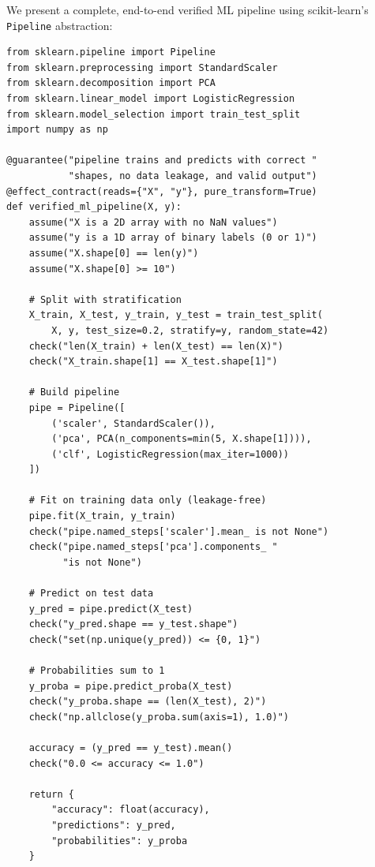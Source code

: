 \documentclass[11pt,a4paper]{report}
\theoremstyle{definition}
\theoremstyle{plain}
\begin{document}
We present a complete, end-to-end verified ML pipeline using
scikit-learn's \texttt{Pipeline} abstraction:

\begin{lstlisting}[style=synhopy]
from sklearn.pipeline import Pipeline
from sklearn.preprocessing import StandardScaler
from sklearn.decomposition import PCA
from sklearn.linear_model import LogisticRegression
from sklearn.model_selection import train_test_split
import numpy as np

@guarantee("pipeline trains and predicts with correct "
           "shapes, no data leakage, and valid output")
@effect_contract(reads={"X", "y"}, pure_transform=True)
def verified_ml_pipeline(X, y):
    assume("X is a 2D array with no NaN values")
    assume("y is a 1D array of binary labels (0 or 1)")
    assume("X.shape[0] == len(y)")
    assume("X.shape[0] >= 10")

    # Split with stratification
    X_train, X_test, y_train, y_test = train_test_split(
        X, y, test_size=0.2, stratify=y, random_state=42)
    check("len(X_train) + len(X_test) == len(X)")
    check("X_train.shape[1] == X_test.shape[1]")

    # Build pipeline
    pipe = Pipeline([
        ('scaler', StandardScaler()),
        ('pca', PCA(n_components=min(5, X.shape[1]))),
        ('clf', LogisticRegression(max_iter=1000))
    ])

    # Fit on training data only (leakage-free)
    pipe.fit(X_train, y_train)
    check("pipe.named_steps['scaler'].mean_ is not None")
    check("pipe.named_steps['pca'].components_ "
          "is not None")

    # Predict on test data
    y_pred = pipe.predict(X_test)
    check("y_pred.shape == y_test.shape")
    check("set(np.unique(y_pred)) <= {0, 1}")

    # Probabilities sum to 1
    y_proba = pipe.predict_proba(X_test)
    check("y_proba.shape == (len(X_test), 2)")
    check("np.allclose(y_proba.sum(axis=1), 1.0)")

    accuracy = (y_pred == y_test).mean()
    check("0.0 <= accuracy <= 1.0")

    return {
        "accuracy": float(accuracy),
        "predictions": y_pred,
        "probabilities": y_proba
    }
\end{lstlisting}
\end{document}
